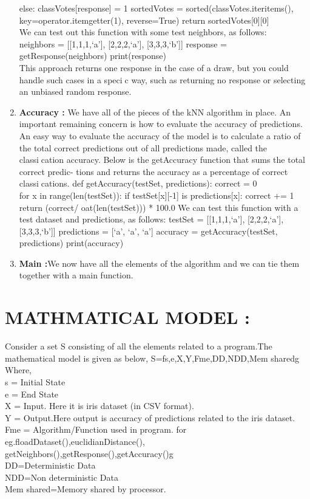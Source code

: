 \documentclass{article}
\begin{document}
\begin{enumerate}
		else: classVotes[response] = 1 sortedVotes = sorted(classVotes.iteritems(),
		key=operator.itemgetter(1), reverse=True) return sortedVotes[0][0]\\We can test out this function with some test neighbors, as follows:\\neighbors = [[1,1,1,`a'], [2,2,2,`a'], [3,3,3,`b']] response = getResponse(neighbors)
		print(response)\\This approach returns one response in the case of a draw, but you
		could handle such cases in a specic way, such as returning no response
		or selecting an unbiased random response.
		\item \textbf{Accuracy :}
		We have all of the pieces of the kNN algorithm in place. An important
		remaining concern is how to evaluate the accuracy of predictions.
		An easy way to evaluate the accuracy of the model is to calculate a
		ratio of the total correct predictions out of all predictions made, called
		the classication accuracy.
		Below is the getAccuracy function that sums the total correct predic-
		tions and returns the accuracy as a percentage of correct classications.
		def getAccuracy(testSet, predictions): correct = 0\\for x in range(len(testSet)): if testSet[x][-1] is predictions[x]: correct
		+= 1
		return (correct/
		oat(len(testSet))) * 100.0
		We can test this function with a test dataset and predictions, as follows:
		testSet = [[1,1,1,`a'], [2,2,2,`a'], [3,3,3,`b']] predictions = [`a', `a', `a']
		accuracy = getAccuracy(testSet, predictions) print(accuracy)
		\item \textbf{Main :}We now have all the elements of the algorithm and we can tie them
		together with a main function.
		
	\end{enumerate}
	\section{MATHMATICAL MODEL :}
	Consider a set S consisting of all the elements related to a program.The
	mathematical model is given as below,
	S=fs,e,X,Y,Fme,DD,NDD,Mem sharedg\\Where,\\
	s = Initial State\\
	e = End State\\
	X = Input. Here it is iris dataset (in CSV format).\\
	Y = Output.Here output is accuracy of predictions related to the iris dataset.\\
	Fme = Algorithm/Function used in program. for eg.floadDataset(),euclidianDistance(),
	getNeighbors(),getResponse(),getAccuracy()g\\
	DD=Deterministic Data\\
	NDD=Non deterministic Data\\
	Mem shared=Memory shared by processor.
\end{document}

